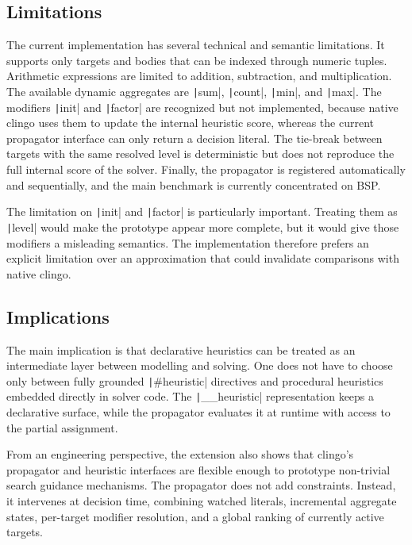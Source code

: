 \subsection{Limitations}

The current implementation has several technical and semantic limitations. It supports only targets and bodies that can be indexed through numeric tuples. Arithmetic expressions are limited to addition, subtraction, and multiplication. The available dynamic aggregates are \texttt|sum|, \texttt|count|, \texttt|min|, and \texttt|max|. The modifiers \texttt|init| and \texttt|factor| are recognized but not implemented, because native clingo uses them to update the internal heuristic score, whereas the current propagator interface can only return a decision literal. The tie-break between targets with the same resolved level is deterministic but does not reproduce the full internal score of the solver. Finally, the propagator is registered automatically and sequentially, and the main benchmark is currently concentrated on BSP.

The limitation on \texttt|init| and \texttt|factor| is particularly important. Treating them as \texttt|level| would make the prototype appear more complete, but it would give those modifiers a misleading semantics. The implementation therefore prefers an explicit limitation over an approximation that could invalidate comparisons with native clingo.

\subsection{Implications}

The main implication is that declarative heuristics can be treated as an intermediate layer between modelling and solving. One does not have to choose only between fully grounded \texttt|#heuristic| directives and procedural heuristics embedded directly in solver code. The \texttt|__heuristic| representation keeps a declarative surface, while the propagator evaluates it at runtime with access to the partial assignment.

From an engineering perspective, the extension also shows that clingo's propagator and heuristic interfaces are flexible enough to prototype non-trivial search guidance mechanisms. The propagator does not add constraints. Instead, it intervenes at decision time, combining watched literals, incremental aggregate states, per-target modifier resolution, and a global ranking of currently active targets.

